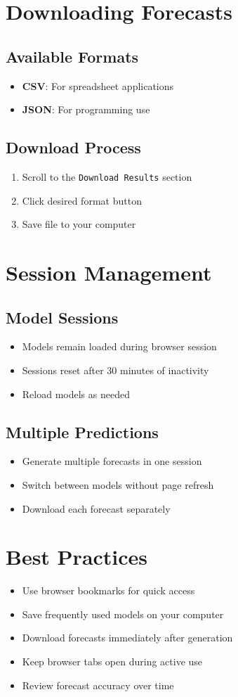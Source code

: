 \section{Downloading Forecasts}

\subsection{Available Formats}
\begin{itemize}
	\item \textbf{CSV}: For spreadsheet applications
	\item \textbf{JSON}: For programming use
\end{itemize}

\subsection{Download Process}
\begin{enumerate}
	\item Scroll to the \texttt{Download Results} section
	\item Click desired format button
	\item Save file to your computer
\end{enumerate}

\section{Session Management}

\subsection{Model Sessions}
\begin{itemize}
	\item Models remain loaded during browser session
	\item Sessions reset after 30 minutes of inactivity
	\item Reload models as needed
\end{itemize}

\subsection{Multiple Predictions}
\begin{itemize}
	\item Generate multiple forecasts in one session
	\item Switch between models without page refresh
	\item Download each forecast separately
\end{itemize}

\section{Best Practices}

\begin{itemize}
	\item Use browser bookmarks for quick access
	\item Save frequently used models on your computer
	\item Download forecasts immediately after generation
	\item Keep browser tabs open during active use
	\item Review forecast accuracy over time
\end{itemize}
